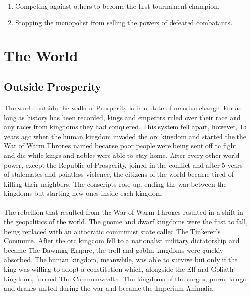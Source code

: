 \begin{enumerate}
    \item Competing against others to become the first tournament champion.
    \item Stopping the monopolist from selling the powers of defeated combatants.
\end{enumerate}

\section{The World}

\subsection{Outside Prosperity}

\paragraph{} The world outside the walls of Prosperity is in a state of massive change. For as long as history has been recorded, kings and emperors ruled over their race and any races from kingdoms they had conquered. This system fell apart, however, 15 years ago when the human kingdom invaded the orc kingdom and started the the War of Warm Thrones named because poor people were being sent off to fight and die while kings and nobles were able to stay home. After every other world power, except the Republic of Prosperity, joined in the conflict and after 5 years of stalemates and pointless violence, the citizens of the world became tired of killing their neighbors. The conscripts rose up, ending the war between the kingdoms but starting new ones inside each kingdom.

\paragraph{} The rebellion that resulted from the War of Warm Thrones resulted in a shift in the geopolitics of the world. The gnome and dwarf kingdoms were the first to fall, being replaced with an autocratic communist state called The Tinkerer's Commune. After the orc kingdom fell to a nationalist military dictatorship and became The Dawning Empire, the troll and goblin kingdoms were quickly absorbed. The human kingdom, meanwhile, was able to survive but only if the king was willing to adopt a constitution which, alongside the Elf and Goliath kingdoms, formed The Commonwealth. The kingdoms of the corgos, purrs, kongs and drakes united during the war and became the Imperium Animalia.

